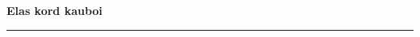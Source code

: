 \documentclass[10pt]{book}
\begin{document}
{
  \samepage
  \raggedbottom
  \raggedright
  \sloppy


  \vspace{0.2in}

  \noindent\begin{minipage}{.1\textwidth}
    \hfill\vspace{0.1in}
  \end{minipage}%
  \noindent\begin{minipage}{.8\textwidth}
    \centering
    \bfseries
    \large Elas kord kauboi
  \end{minipage}%
  \noindent\begin{minipage}{.1\textwidth}
      \hfill\vspace{0.1in}
  \end{minipage}

  \nopagebreak[4]
  \vspace{0.1in}
  \nopagebreak[4]
  \hrule height 0.05ex
  \nopagebreak[4]
  \vspace{-0.05in}




}
\end{document}
